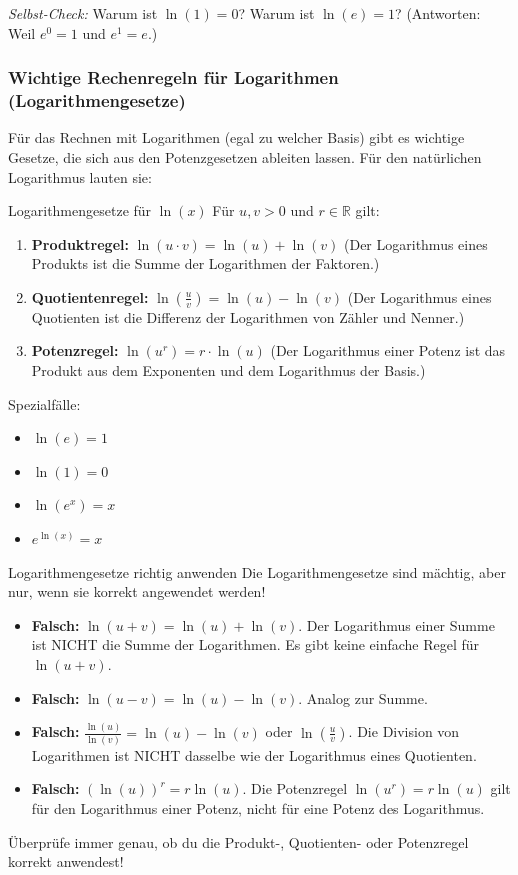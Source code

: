 \textit{Selbst-Check:} Warum ist $\ln(1)=0$? Warum ist $\ln(e)=1$? (Antworten: Weil $e^0=1$ und $e^1=e$.)

\subsubsection{Wichtige Rechenregeln für Logarithmen (Logarithmengesetze)}
Für das Rechnen mit Logarithmen (egal zu welcher Basis) gibt es wichtige Gesetze, die sich aus den Potenzgesetzen ableiten lassen. Für den natürlichen Logarithmus lauten sie:

\begin{merksatzumgebung}{Logarithmengesetze für \texorpdfstring{$\ln(x)$}{ln(x)}}
Für $u, v > 0$ und $r \in \mathbb{R}$ gilt:
\begin{enumerate}[label=\arabic*)]
    \item \textbf{Produktregel:} $\ln(u \cdot v) = \ln(u) + \ln(v)$
    (Der Logarithmus eines Produkts ist die Summe der Logarithmen der Faktoren.)
    \item \textbf{Quotientenregel:} $\ln\left(\frac{u}{v}\right) = \ln(u) - \ln(v)$
    (Der Logarithmus eines Quotienten ist die Differenz der Logarithmen von Zähler und Nenner.)
    \item \textbf{Potenzregel:} $\ln(u^r) = r \cdot \ln(u)$
    (Der Logarithmus einer Potenz ist das Produkt aus dem Exponenten und dem Logarithmus der Basis.)
\end{enumerate}
Spezialfälle:
\begin{itemize}
    \item $\ln(e) = 1$
    \item $\ln(1) = 0$
    \item $\ln(e^x) = x$
    \item $e^{\ln(x)} = x$
\end{itemize}
\end{merksatzumgebung}

\begin{fehlerboxumgebung}{Logarithmengesetze richtig anwenden}
Die Logarithmengesetze sind mächtig, aber nur, wenn sie korrekt angewendet werden!
\begin{itemize}
    \item \textbf{Falsch:} $\ln(u+v) = \ln(u) + \ln(v)$. Der Logarithmus einer Summe ist NICHT die Summe der Logarithmen. Es gibt keine einfache Regel für $\ln(u+v)$.
    \item \textbf{Falsch:} $\ln(u-v) = \ln(u) - \ln(v)$. Analog zur Summe.
    \item \textbf{Falsch:} $\frac{\ln(u)}{\ln(v)} = \ln(u) - \ln(v)$ oder $\ln(\frac{u}{v})$. Die Division von Logarithmen ist NICHT dasselbe wie der Logarithmus eines Quotienten.
    \item \textbf{Falsch:} $(\ln(u))^r = r \ln(u)$. Die Potenzregel $\ln(u^r)=r\ln(u)$ gilt für den Logarithmus einer Potenz, nicht für eine Potenz des Logarithmus.
\end{itemize}
Überprüfe immer genau, ob du die Produkt-, Quotienten- oder Potenzregel korrekt anwendest!
\end{fehlerboxumgebung}

